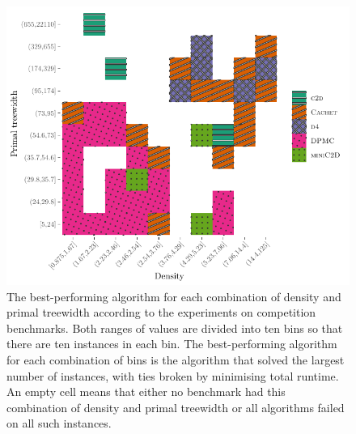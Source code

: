 \documentclass[runningheads]{llncs}
\begin{document}
\begin{figure}[t]
  \centering
  \includegraphics{real.pdf}
  \caption{The best-performing algorithm for each combination of density and
    primal treewidth according to the experiments on competition benchmarks.
    Both ranges of values are divided into ten bins so that there are ten
    instances in each bin. The best-performing algorithm for each combination of
    bins is the algorithm that solved the largest number of instances, with ties
    broken by minimising total runtime. An empty cell means that either no
    benchmark had this combination of density and primal treewidth or all
    algorithms failed on all such instances.}\label{fig:real}
\end{figure}
\end{document}
